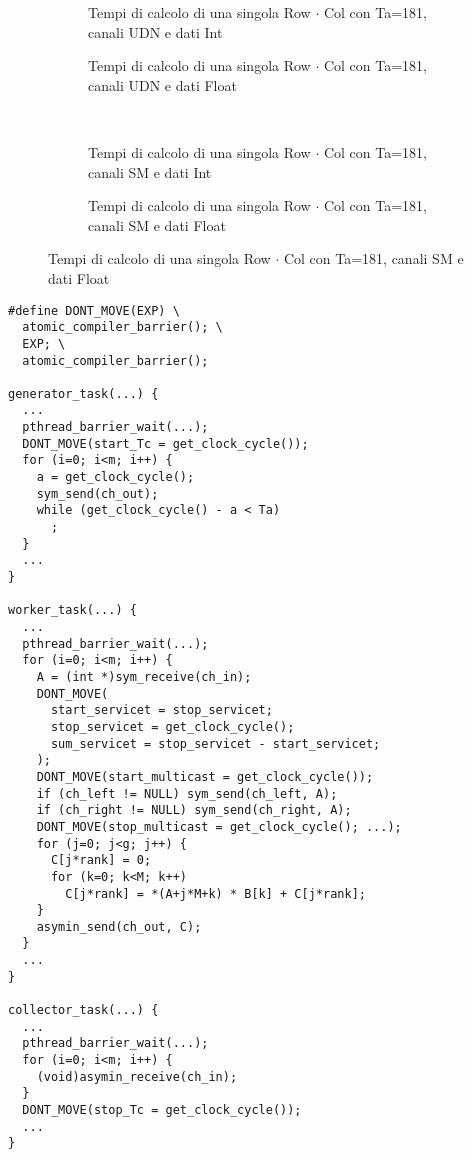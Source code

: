 \documentclass[a4paper]{article}
\begin{document}
\begin{figure}
  \begin{subfigure}[b]{.5\textwidth}
    \centering
    \resizebox{\columnwidth}{!}{}
    \caption{Tempi di calcolo di una singola Row $\cdot$ Col con Ta=181, canali UDN e dati Int}
  \end{subfigure}
  \hspace{2ex}
  \begin{subfigure}[b]{.5\textwidth}
    \centering
    \resizebox{\columnwidth}{!}{}
    \caption{Tempi di calcolo di una singola Row $\cdot$ Col con Ta=181, canali UDN e dati Float}
  \end{subfigure}
  ~
  \begin{subfigure}[b]{.5\textwidth}
    \centering
    \resizebox{\columnwidth}{!}{}
    \caption{Tempi di calcolo di una singola Row $\cdot$ Col con Ta=181, canali SM e dati Int}
  \end{subfigure}
  \hspace{2ex}
  \begin{subfigure}[b]{.5\textwidth}
    \centering
    \resizebox{\columnwidth}{!}{}
    \caption{Tempi di calcolo di una singola Row $\cdot$ Col con Ta=181, canali SM e dati Float}
  \end{subfigure}
\end{figure}

\begin{lstlisting}
#define DONT_MOVE(EXP) \
  atomic_compiler_barrier(); \
  EXP; \
  atomic_compiler_barrier(); 

generator_task(...) {
  ...
  pthread_barrier_wait(...);
  DONT_MOVE(start_Tc = get_clock_cycle());
  for (i=0; i<m; i++) {
    a = get_clock_cycle();
    sym_send(ch_out);
    while (get_clock_cycle() - a < Ta) 
      ;
  }
  ...
}

worker_task(...) {
  ...
  pthread_barrier_wait(...);
  for (i=0; i<m; i++) {
    A = (int *)sym_receive(ch_in);
    DONT_MOVE(
      start_servicet = stop_servicet;
      stop_servicet = get_clock_cycle();
      sum_servicet = stop_servicet - start_servicet;
    );
    DONT_MOVE(start_multicast = get_clock_cycle());
    if (ch_left != NULL) sym_send(ch_left, A);
    if (ch_right != NULL) sym_send(ch_right, A);
    DONT_MOVE(stop_multicast = get_clock_cycle(); ...);
    for (j=0; j<g; j++) {
      C[j*rank] = 0;
      for (k=0; k<M; k++) 
        C[j*rank] = *(A+j*M+k) * B[k] + C[j*rank];
    }
    asymin_send(ch_out, C);
  }
  ...
}

collector_task(...) {
  ...
  pthread_barrier_wait(...);
  for (i=0; i<m; i++) {
    (void)asymin_receive(ch_in);
  }
  DONT_MOVE(stop_Tc = get_clock_cycle());
  ...
}
\end{lstlisting}
\end{document}
